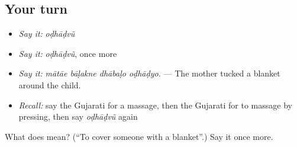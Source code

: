\subsection*{Your turn}
\begin{itemize}
\raggedright
  \item \emph{Say it:} \emph{oḍhāḍvũ}
  \item \emph{Say it:} \emph{oḍhāḍvũ}, once more
  \item \emph{Say it:} \emph{mātāe bāḷakne dhābaḷo oḍhāḍyo.} — The mother tucked a blanket around the child.
  \item \emph{Recall:} say the Gujarati for a massage, then the Gujarati for to massage by pressing, then say \emph{oḍhāḍvũ} again
\end{itemize}

\begin{tcolorbox}[breakable,colback=teal!4,colframe=teal!35!black,title={Before you move on}]
What does  mean? (\textquotedblleft{}To cover someone with a blanket\textquotedblright{}.) Say it once more.
\end{tcolorbox}
